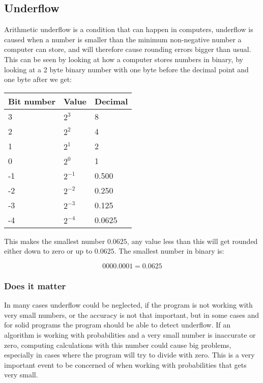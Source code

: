\subsection{Underflow}
    Arithmetic underflow is a condition that can happen in computers, underflow is caused when a number is smaller than the minimum non-negative number a computer can store, and will therefore cause rounding errors bigger than usual. This can be seen by looking at how a computer stores numbers in binary, by looking at a 2 byte binary number with one byte before the decimal point and one byte after we get:\\

\begin{table}[!h]
    \begin{tabular}{|l|l|l|}
        \hline
        Bit number & Value    & Decimal \\ \hline
        3          & $2^3$    & 8       \\ 
        2          & $2^2$    & 4       \\ 
        1          & $2^1$    & 2       \\ 
        0          & $2^0$    & 1       \\ 
        -1         & $2^{-1}$ & 0.500   \\ 
        -2         & $2^{-2}$ & 0.250   \\ 
        -3         & $2^{-3}$ & 0.125   \\ 
        -4         & $2^{-4}$ & 0.0625  \\
        \hline
    \end{tabular}
\end{table}

    This makes the smallest number $0.0625$, any value less than this will get rounded either down to zero or up to $0.0625$. The smallest number in binary is:

    $$0000.0001 = 0.0625$$

\subsubsection{Does it matter}
In many cases underflow could be neglected, if the program is not working with very small numbers, or the accuracy is not that important, but in some cases and for solid programs the program should be able to detect underflow. If an algorithm is working with probabilities and a very small number is inaccurate or zero, computing calculations with this number could cause big problems, especially in cases where the program will try to divide with zero. This is a very important event to be concerned of when working with probabilities that gets very small.  

